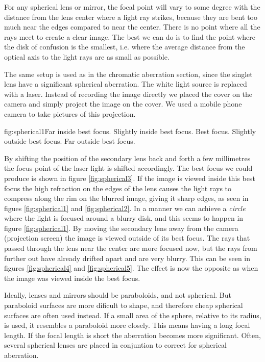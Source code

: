 For any spherical lens or mirror, the focal point will vary to some degree with 
the distance from the lens center where a light ray strikes, because they are 
bent too much near the edges compared to near the center. There is no point 
where all the rays meet to create a clear image. The best we can do is to find 
the point where the disk of confusion is the smallest, i.e. where the
average distance from the optical axis to the light rays are as small as
possible.

The same setup is used as in the chromatic aberration section, since the
singlet lens have a significant spherical aberration. The white light source is
replaced with a laser. Instead of recording the image directly we placed the
cover on the camera and simply project the image on the cover. We used a mobile
phone camera to take pictures of this projection.

      {fig:spherical1}{Far inside best focus.}
      {Slightly inside best focus.}
      {Best focus.}
      {Slightly outside best focus.}
      {Far outside best focus.}

By shifting the position of the secondary lens back and forth a few millimetres
the focus point of the laser light is shifted accordingly. The best focus we
could produce
is shown in figure \vref{fig:spherical3}. If the image is viewed inside this
best focus the high refraction on the edges of the lens causes the light rays
to compress along the rim on the blurred image, giving it sharp edges, as seen
in figues \vref{fig:spherical1} and \vref{fig:spherical2}. In a manner we can
achieve a \emph{circle} where the light is focused around a blurry disk, and
this seems to happen in figure \ref{fig:spherical1}. By moving the secondary
lens away from the camera (projection screen) the image is viewed outside of
its best focus. The rays that passed through the lens near the center
are more focused now, but the rays from further out have already drifted apart
and are very blurry. This can be seen in figures \ref{fig:spherical4} and
\vref{fig:spherical5}. The effect is now the opposite as when the image was
viewed inside the best focus.

Ideally, lenses and mirrors should be paraboloids, and not spherical. But
paraboloid surfaces are more dificult to shape, and therefore cheap spherical
surfaces are often used instead. If a small area of the sphere, relative to its
radius, is used, it resembles a paraboloid more closely. This means having a
long focal length. If the focal length is short the aberration becomes more
significant. Often, several spherical lenses are placed in conjuntion to
correct for spherical aberration.
